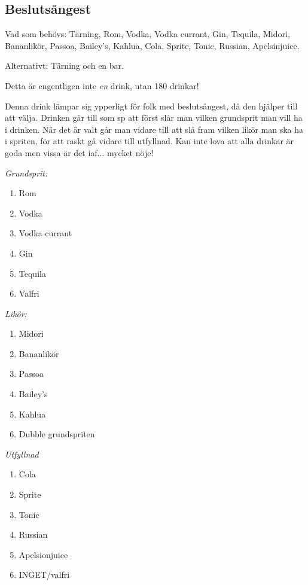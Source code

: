 

\pagestyle{Drinktips}



\subsection{\textbf{Beslutsångest}}

Vad som behövs: Tärning, Rom, Vodka, Vodka currant, Gin, Tequila, Midori, Bananlikör, Passoa, Bailey's, Kahlua, Cola, Sprite, Tonic, Russian, Apelsinjuice.

Alternativt: Tärning och en bar.

Detta är engentligen inte \emph{en} drink, utan 180 drinkar!

Denna drink lämpar sig ypperligt för folk med beslutsångest, då den hjälper till att välja. Drinken går till som sp att först slår man vilken grundsprit man vill ha i drinken. När det är valt går man vidare till att slå fram vilken likör man ska ha i spriten, för att raskt gå vidare till utfyllnad. Kan inte lova att alla drinkar är goda men vissa är det iaf... mycket nöje!

\emph{Grundsprit:}
\begin{enumerate}
    \item Rom
    \item Vodka
    \item Vodka currant
    \item Gin
    \item Tequila
    \item Valfri
\end{enumerate}

\emph{Likör:}
\begin{enumerate}
    \item Midori
    \item Bananlikör
    \item Passoa
    \item Bailey's
    \item Kahlua
    \item Dubble grundspriten
\end{enumerate}

\emph{Utfyllnad}
\begin{enumerate}
    \item Cola
    \item Sprite
    \item Tonic
    \item Russian
    \item Apelsionjuice
    \item INGET/valfri
\end{enumerate}

